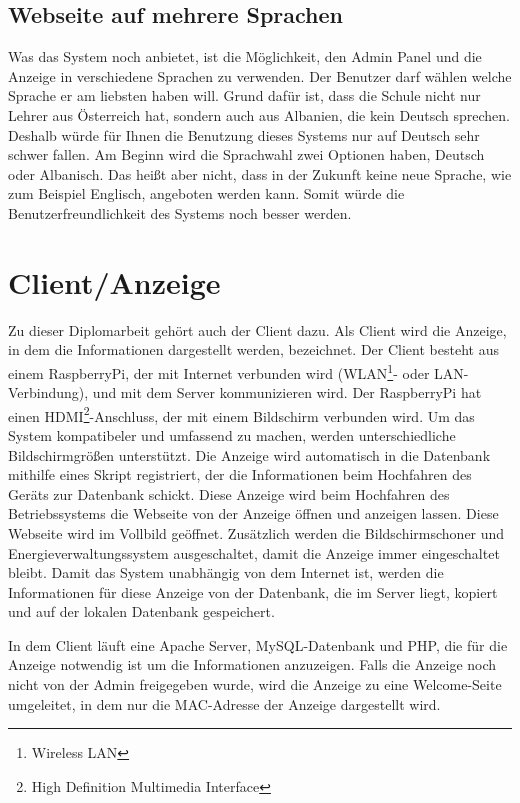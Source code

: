 \subsection{Webseite auf mehrere Sprachen}

Was das System noch anbietet, ist die Möglichkeit, den Admin Panel und die Anzeige in verschiedene Sprachen zu verwenden. Der Benutzer darf wählen welche Sprache er am liebsten haben will. Grund dafür ist, dass die Schule nicht nur Lehrer aus Österreich hat, sondern auch aus Albanien, die kein Deutsch sprechen. Deshalb würde für Ihnen die Benutzung dieses Systems nur auf Deutsch sehr schwer fallen. Am Beginn wird die Sprachwahl zwei Optionen haben, Deutsch oder Albanisch. Das heißt aber nicht, dass in der Zukunft keine neue Sprache, wie zum Beispiel Englisch, angeboten werden kann. Somit würde die Benutzerfreundlichkeit des Systems noch besser werden.

\section{Client/Anzeige}

Zu dieser Diplomarbeit geh\"{o}rt auch der Client dazu. Als Client wird die Anzeige, in dem die Informationen dargestellt werden, bezeichnet. Der Client besteht aus einem RaspberryPi, der mit Internet verbunden wird (WLAN\footnote{Wireless LAN}- oder LAN-
Verbindung), und mit dem Server kommunizieren wird. Der RaspberryPi hat einen HDMI\footnote{High Definition Multimedia Interface}-Anschluss, der mit einem Bildschirm verbunden wird. Um das System kompatibeler und umfassend zu machen, werden unterschiedliche Bildschirmgr\"{o}\ss{}en unterst\"{u}tzt. Die Anzeige wird automatisch  in die Datenbank mithilfe eines Skript registriert, der die Informationen beim Hochfahren des Ger\"{a}ts zur Datenbank schickt. Diese Anzeige wird beim Hochfahren des Betriebssystems die Webseite von der Anzeige \"{o}ffnen und anzeigen lassen. Diese Webseite wird im Vollbild ge\"{o}ffnet. Zus\"{a}tzlich werden die Bildschirmschoner und Energieverwaltungssystem ausgeschaltet, damit die Anzeige immer eingeschaltet bleibt. Damit das System unabh\"{a}ngig von dem Internet ist, werden die Informationen f\"{u}r diese Anzeige von der Datenbank, die im Server liegt, kopiert und auf der lokalen Datenbank gespeichert. 

In dem Client l\"auft eine Apache Server, MySQL-Datenbank und PHP, die f\"{u}r die Anzeige notwendig ist um die Informationen anzuzeigen. Falls die Anzeige noch nicht von der Admin freigegeben wurde, wird die Anzeige zu eine Welcome-Seite umgeleitet, in dem nur die MAC-Adresse der Anzeige dargestellt wird.

